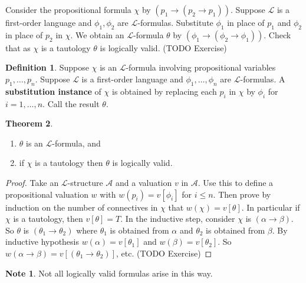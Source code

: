 \documentclass{article}
\newcommand{\rb}[1]{\left( #1 \right)}
\renewcommand{\sb}[1]{\left[ #1 \right]}
\newcommand{\impb}[2]{\rb{#1 \rightarrow #2}}
\theoremstyle{definition}\newtheorem{definition}{Definition}[subsection]
\theoremstyle{definition}\newtheorem{remark}[definition]{Remark}
\theoremstyle{definition}\newtheorem*{example}{Example}
\theoremstyle{definition}\newtheorem*{note}{Note}
\newtheorem{theorem}[definition]{Theorem}
\begin{document}
Consider the propositional formula $ \chi $ by $ \impb{p_1}{\impb{p_2}{p_1}} $. Suppose $ \mathcal{L} $ is a first-order language and $ \phi_1, \phi_2 $ are $ \mathcal{L} $-formulas. Substitute $ \phi_1 $ in place of $ p_1 $ and $ \phi_2 $ in place of $ p_2 $ in $ \chi $. We obtain an $ \mathcal{L} $-formula $ \theta $ by $ \impb{\phi_1}{\impb{\phi_2}{\phi_1}} $. Check that as $ \chi $ is a tautology $ \theta $ is logically valid. (TODO Exercise)

\begin{definition}
Suppose $ \chi $ is an $ \mathcal{L} $-formula involving propositional variables $ p_1, \dots, p_n $. Suppose $ \mathcal{L} $ is a first-order language and $ \phi_1, \dots, \phi_n $ are $ \mathcal{L} $-formulas. A \textbf{substitution instance} of $ \chi $ is obtained by replacing each $ p_i $ in $ \chi $ by $ \phi_i $ for $ i = 1, \dots, n $. Call the result $ \theta $.
\end{definition}

\begin{theorem}
\hfill
\begin{enumerate}
\item $ \theta $ is an $ \mathcal{L} $-formula, and
\item if $ \chi $ is a tautology then $ \theta $ is logically valid.
\end{enumerate}
\end{theorem}


\begin{proof}
Take an $ \mathcal{L} $-structure $ \mathcal{A} $ and a valuation $ v $ in $ \mathcal{A} $. Use this to define a propositional valuation $ w $ with $ w\rb{p_i} = v\sb{\phi_i} $ for $ i \le n $. Then prove by induction on the number of connectives in $ \chi $ that $ w\rb{\chi} = v\sb{\theta} $. In particular if $ \chi $ is a tautology, then $ v\sb{\theta} = T $. In the inductive step, consider $ \chi $ is $ \impb{\alpha}{\beta} $. So $ \theta $ is $ \impb{\theta_1}{\theta_2} $ where $ \theta_1 $ is obtained from $ \alpha $ and $ \theta_2 $ is obtained from $ \beta $. By inductive hypothesis $ w\rb{\alpha} = v\sb{\theta_1} $ and $ w\rb{\beta} = v\sb{\theta_2} $. So $ w\impb{\alpha}{\beta} = v\sb{\impb{\theta_1}{\theta_2}} $, etc. (TODO Exercise)
\end{proof}

\begin{note}
Not all logically valid formulas arise in this way.
\end{note}
\end{document}
